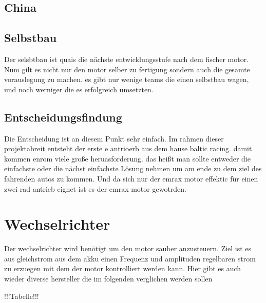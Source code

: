 \subsection{China}

\subsection{Selbstbau}
Der selsbtbau ist quais die nächste entwicklungsstufe nach dem fischer motor. Num gilt es nicht nur den motor selber zu fertigung sondern auch die gesamte vorauslegung zu machen. es gibt nur wenige teams die einen selbstbau wagen, und noch werniger die es erfolgreich umsetzten.

\subsection{Entscheidungsfindung}

Die Entscheidung ist an diesem Punkt sehr einfach. Im rahmen dieser projektabreit entsteht der erste e antrioerb aus dem hause baltic racing. damit kommen enrom viele große heruasforderung. das heißt man sollte entweder die einfachste oder die nächst einfachste Lösung nehmen um am ende zu dem ziel des fahrenden autos zu kommen. Und da sich nur der emrax motor effektic für einen zwei rad antrieb eignet ist es der emrax motor gewotrden.

\section{Wechselrichter}
Der wechselrichter wird benötigt um den motor sauber anzusteuern. Ziel ist es aus gleichstrom aus dem akku einen Frequenz und amplituden regelbaren strom zu erzuegen mit dem der motor kontrolliert werden kann. Hier gibt es auch wieder diverse hersteller die im folgenden verglichen werden sollen

!!!Tabelle!!!

